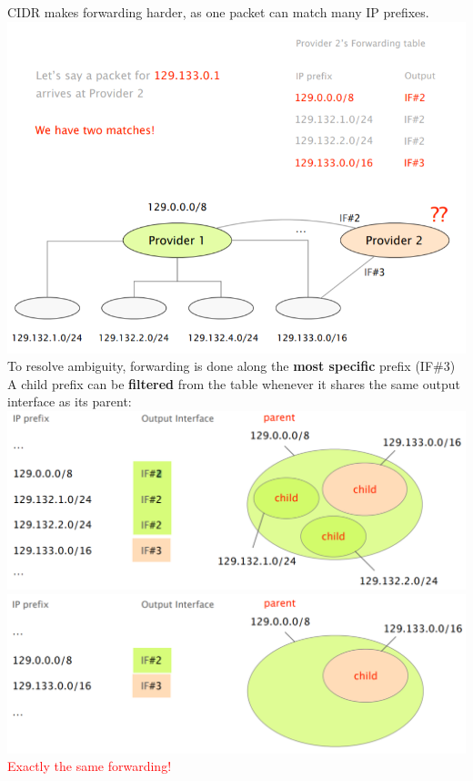 \documentclass[a4paper, fontsize=8pt, landscape, DIV=1]{scrartcl}
\begin{document}
\begin{multicols*}{4}
   		CIDR makes forwarding harder, as one packet can match many IP prefixes.\\
   		\includegraphics[width=\columnwidth]{images/Network_Layer/two_matches.png}
   		To resolve ambiguity, forwarding is done along the \textbf{most specific} prefix (IF\#3)\\
   		A child prefix can be \textbf{filtered} from the table whenever it shares the same output interface as its parent:
   		\includegraphics[width=\columnwidth]{images/Network_Layer/filtering1.png}
   		\includegraphics[width=\columnwidth]{images/Network_Layer/filtering2.png}
   		\textcolor{Red}{Exactly the same forwarding!}
   		

\end{multicols*}
\end{document}
